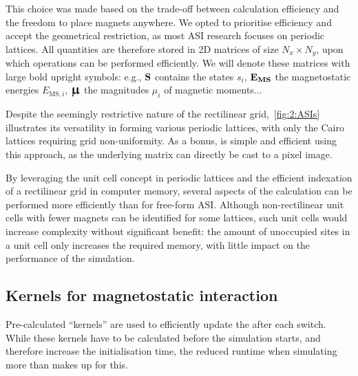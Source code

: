 \vspace{-1em}

This choice was made based on the trade-off between calculation efficiency and the freedom to place magnets anywhere.
We opted to prioritise efficiency and accept the geometrical restriction, as most ASI research focuses on periodic lattices.
All quantities are therefore stored in 2D matrices of size $N_x \times N_y$, upon which operations can be performed efficiently.
We will denote these matrices with large bold upright symbols: e.g., $\boldsymbol{\mathbf{S}}$ contains the states $s_i$, $\boldsymbol{\mathbf{E_\mathrm{MS}}}$ the magnetostatic energies $E_{\mathrm{MS},i}$, $\vc{\bigmu}$ the magnitudes $\mu_i$ of magnetic moments... \par
Despite the seemingly restrictive nature of the rectilinear grid,~\cref{fig:2:ASIs} illustrates its versatility in forming various periodic lattices, with only the Cairo lattices requiring grid non-uniformity.
As a bonus,  is simple and efficient using this approach, as the underlying matrix can directly be cast to a pixel image. \\\par
By leveraging the unit cell concept in periodic lattices and the efficient indexation of a rectilinear grid in computer memory, several aspects of the calculation can be performed more efficiently than for free-form ASI.
Although non-rectilinear unit cells with fewer magnets can be identified for some lattices, such unit cells would increase complexity without significant benefit: the amount of unoccupied sites in a unit cell only increases the required memory, with little impact on the performance of the simulation.

\subsection{Kernels for magnetostatic interaction}\label{sec:2:Kernels}
Pre-calculated ``kernels'' are used to efficiently update the  after each switch. 
While these kernels have to be calculated before the simulation starts, and therefore increase the initialisation time, the reduced runtime when simulating  more than makes up for this.

